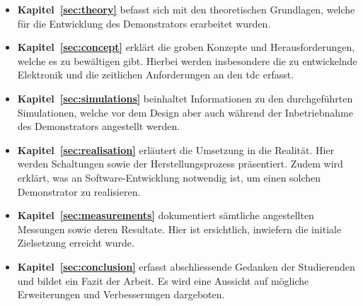 \begin{itemize}
    \item \textbf{Kapitel~\ref{sec:theory}} befasst sich mit den theoretischen Grundlagen, welche für die Entwicklung des
          Demonstrators erarbeitet wurden.

    \item \textbf{Kapitel~\ref{sec:concept}} erklärt die groben Konzepte und Herausforderungen, welche es zu bewältigen gibt.
          Hierbei werden insbesondere die zu entwickelnde Elektronik und die zeitlichen Anforderungen an den \acrshort{tdc} erfasst.

    \item \textbf{Kapitel~\ref{sec:simulations}} beinhaltet Informationen zu den durchgeführten Simulationen, welche vor
          dem Design aber auch während der Inbetriebnahme des Demonstrators angestellt werden.

    \item \textbf{Kapitel~\ref{sec:realisation}} erläutert die Umsetzung in die Realität. Hier werden Schaltungen sowie
          der Herstellungsprozess präsentiert. Zudem wird erklärt, was an Software-Entwicklung notwendig ist, um einen
          solchen Demonstrator zu realisieren.

    \item \textbf{Kapitel~\ref{sec:measurements}} dokumentiert sämtliche angestellten Messungen sowie deren Resultate. Hier
          ist ersichtlich, inwiefern die initiale Zielsetzung erreicht wurde.

    \item \textbf{Kapitel~\ref{sec:conclusion}} erfasst abschliessende Gedanken der Studierenden und bildet ein Fazit der Arbeit.
          Es wird eine Aussicht auf mögliche Erweiterungen und Verbesserungen dargeboten.
\end{itemize}
